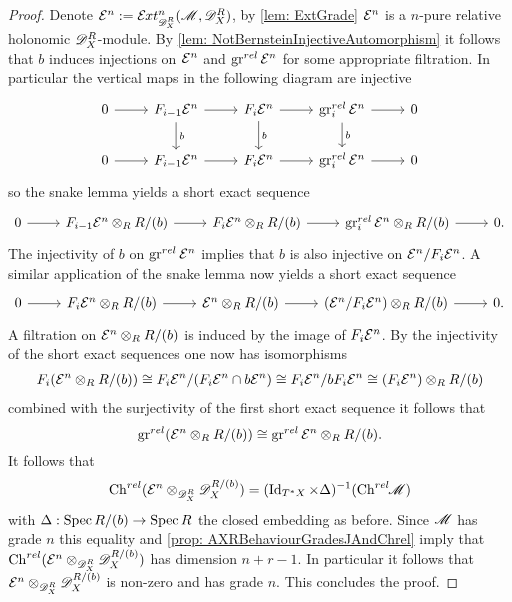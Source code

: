 \begin{proof}
  Denote $\E^n := \Ex{\D_X^R}{n}(\M,\D_X^R)$, by \cref{lem: ExtGrade} $\mathcal{E}^n$ is a $n$-pure relative holonomic $\mathscr{D}_X^R$-module.
  By \cref{lem: NotBernsteinInjectiveAutomorphism} it follows that $b$ induces injections on $\mathcal{E}^{n}$ and $\operatorname{gr}^{rel} \mathcal{E}^{n}$ for some appropriate filtration.
  In particular the vertical maps in the following diagram are injective
  $$\begin{tikzcd}
    0 \arrow{r} & F_{i-1} \E^n\arrow{r} \arrow{d}{b}& F_i \E^{n}\arrow{r} \arrow{d}{b}& \gr^{rel}_i \E^n\arrow{r}\arrow{d}{b} & 0\\
    0 \arrow{r} & F_{i-1} \E^n\arrow{r} & F_i \E^{n}\arrow{r} & \gr^{rel}_i \E^n\arrow{r} & 0
  \end{tikzcd} $$
  so the snake lemma yields a short exact sequence
  $$\begin{tikzcd}
    0 \arrow{r} & F_{i-1} \E^n\otimes_R R/(b)\arrow{r} & F_i \E^{n}\otimes_R R/(b)\arrow{r} & \gr^{rel}_i \E^n\arrow{r}\otimes_R R/(b) & 0.
  \end{tikzcd} $$
  The injectivity of $b$ on $\operatorname{gr}^{rel}\mathcal{E}^n$ implies that $b$ is also injective on $\mathcal{E}^n/F_i\mathcal{E}^n$. A similar application of the snake lemma now yields a short exact sequence
  $$\begin{tikzcd}
    0 \arrow{r} & F_{i} \E^n\otimes_R R/(b)\arrow{r} & \E^{n}\otimes_R R/(b)\arrow{r} & (\E^n/F_i \E^n )\arrow{r}\otimes_R R/(b) & 0.
  \end{tikzcd} $$
  A filtration on $\mathcal{E}^n \otimes_R R/(b)$ is induced by the image of $F_i\mathcal{E}^n$. By the injectivity of the short exact sequences one now has isomorphisms
  \begin{align*}
    F_i(\mathcal{E}^n \otimes_R R/(b)) \cong F_i\mathcal{E}^n / (F_i \mathcal{E}^n \cap b\mathcal{E}^n) \cong F_i \mathcal{E}^n / b F_i \mathcal{E}^n \cong  (F_i\mathcal{E}^n) \otimes_R R/(b)
  \end{align*}
  combined with the surjectivity of the first short exact sequence it follows that
  $$\operatorname{gr}^{rel}(\mathcal{E}^n \otimes_R R/(b)) \cong \operatorname{gr}^{rel}\mathcal{E}^n \otimes_R R/(b). $$
  It follows that
  $$\operatorname{Ch}^{rel}(\mathcal{E}^n \otimes_{\mathscr{D}_X^R} \mathscr{D}_X^{R/(b)})  = (\operatorname{Id}_{T^*X} \times \Delta)^{-1}(\operatorname{Ch}^{rel}\mkern-5mu \mathscr{M})$$
  with $\Delta: \operatorname{Spec} R/(b) \to \operatorname{Spec} R$ the closed embedding as before.
  Since $\mathscr{M}$ has grade $n$ this equality and \cref{prop: AXRBehaviourGradesJAndChrel} imply that $\operatorname{Ch}^{rel}(\mathcal{E}^n \otimes_{\mathscr{D}_X^R} \mathscr{D}_X^{R/(b)})$ has dimension $n + r - 1$.
  In particular it follows that $\mathcal{E}^n \otimes_{\mathscr{D}_X^R} \mathscr{D}_X^{R/(b)}$ is non-zero and has grade $n$. This concludes the proof.
\end{proof}
